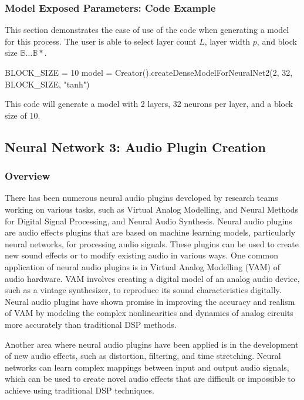 \documentclass{article}
\begin{document}
\subsubsection{Model Exposed Parameters: Code Example}
This section demonstrates the ease of use of the code when generating a model for this process. The user is able to select layer count $L$, layer width $p$, and block size $\mathbb{B} \dots \mathbb{B}*$.
\begin{ffcode}
	BLOCK_SIZE = 10
	model = Creator().createDenseModelForNeuralNet2(2, 32, BLOCK_SIZE, "tanh")
\end{ffcode}

This code will generate a model with 2 layers, 32 neurons per layer, and a block size of 10.
\subsection{Neural Network 3: Audio Plugin Creation}
\subsubsection{Overview}
There has been numerous neural audio plugins developed by research teams working on various tasks, such as Virtual Analog Modelling, and Neural Methods for Digital Signal Processing, and Neural Audio Synthesis. Neural audio plugins are audio effects plugins that are based on machine learning models, particularly neural networks, for processing audio signals. These plugins can be used to create new sound effects or to modify existing audio in various ways. One common application of neural audio plugins is in Virtual Analog Modelling (VAM) of audio hardware. VAM involves creating a digital model of an analog audio device, such as a vintage synthesizer, to reproduce its sound characteristics digitally. Neural audio plugins have shown promise in improving the accuracy and realism of VAM by modeling the complex nonlinearities and dynamics of analog circuits more accurately than traditional DSP methods.

Another area where neural audio plugins have been applied is in the development of new audio effects, such as distortion, filtering, and time stretching. Neural networks can learn complex mappings between input and output audio signals, which can be used to create novel audio effects that are difficult or impossible to achieve using traditional DSP techniques.
\end{document}

